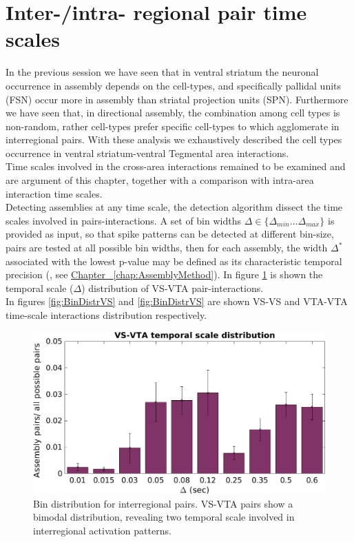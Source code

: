 \section{Inter-/intra- regional pair time scales}
\label{sec:TimeScales}
In the previous session we have seen that in ventral striatum the neuronal occurrence in assembly depends on the cell-types, and specifically pallidal units (FSN) occur more in assembly than striatal projection units (SPN). Furthermore we have seen that, in directional assembly, the combination among cell types is non-random, rather cell-types prefer specific cell-types to which agglomerate in interregional pairs.
With these analysis we exhaustively described the cell types occurrence in ventral striatum-ventral Tegmental area interactions.\\Time scales involved in the cross-area interactions remained to be examined and are argument of this chapter, together with a comparison with intra-area interaction time scales.\\
Detecting assemblies at any time scale, the detection algorithm dissect the time scales involved in pairs-interactions. A set of bin widths $\Delta \in \{\Delta_{min}...\Delta_{max}\}$ is provided as input, so that spike patterns can be detected at different bin-size, pairs are tested at all possible bin widths, then for each assembly, the width $\Delta^*$ associated with the lowest p-value may be defined as its characteristic temporal precision (\cite{RussoDurstewitz}, see \hyperref[chap:AssemblyMethod]{Chapter~ \ref*{chap:AssemblyMethod}}).
In figure \ref{fig:BinDistr} is shown the temporal scale ($\Delta$) distribution of VS-VTA pair-interactions.\\
In figures \ref{fig:BinDistrVS} and \ref{fig:BinDistrVS} are shown VS-VS and VTA-VTA time-scale interactions distribution respectively.\\
\begin{figure}[h!]
\includegraphics[scale=0.46]{figures/VS_VTA_Short1.png}
\caption{Bin distribution for interregional pairs. VS-VTA pairs show a bimodal distribution, revealing two temporal scale involved in interregional activation patterns.}
\label{fig:BinDistr}
\end{figure}

